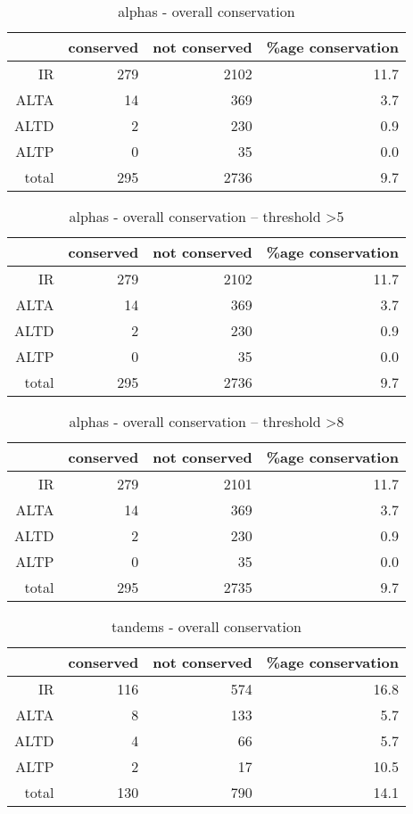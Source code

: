 \documentclass{article}
\begin{document}
\begin{table}[ht]
\centering
\begin{tabular}{rrrr}
  \hline
 & conserved & not conserved & \%age conservation \\ 
  \hline
IR & 279 & 2102 & 11.7 \\ 
  ALTA & 14 & 369 & 3.7 \\ 
  ALTD & 2 & 230 & 0.9 \\ 
  ALTP & 0 & 35 & 0.0 \\ 
  total & 295 & 2736 & 9.7 \\ 
   \hline
\end{tabular}
\caption{alphas - overall conservation} 
\end{table}%
\begin{table}[ht]
\centering
\begin{tabular}{rrrr}
  \hline
 & conserved & not conserved & \%age conservation \\ 
  \hline
IR & 279 & 2102 & 11.7 \\ 
  ALTA & 14 & 369 & 3.7 \\ 
  ALTD & 2 & 230 & 0.9 \\ 
  ALTP & 0 & 35 & 0.0 \\ 
  total & 295 & 2736 & 9.7 \\ 
   \hline
\end{tabular}
\caption{alphas - overall conservation – threshold >5} 
\end{table}%
\begin{table}[ht]
\centering
\begin{tabular}{rrrr}
  \hline
 & conserved & not conserved & \%age conservation \\ 
  \hline
IR & 279 & 2101 & 11.7 \\ 
  ALTA & 14 & 369 & 3.7 \\ 
  ALTD & 2 & 230 & 0.9 \\ 
  ALTP & 0 & 35 & 0.0 \\ 
  total & 295 & 2735 & 9.7 \\ 
   \hline
\end{tabular}
\caption{alphas - overall conservation – threshold >8} 
\end{table}%
\begin{table}[ht]
\centering
\begin{tabular}{rrrr}
  \hline
 & conserved & not conserved & \%age conservation \\ 
  \hline
IR & 116 & 574 & 16.8 \\ 
  ALTA & 8 & 133 & 5.7 \\ 
  ALTD & 4 & 66 & 5.7 \\ 
  ALTP & 2 & 17 & 10.5 \\ 
  total & 130 & 790 & 14.1 \\ 
   \hline
\end{tabular}
\caption{tandems - overall conservation} 
\end{table}%
\end{document}

